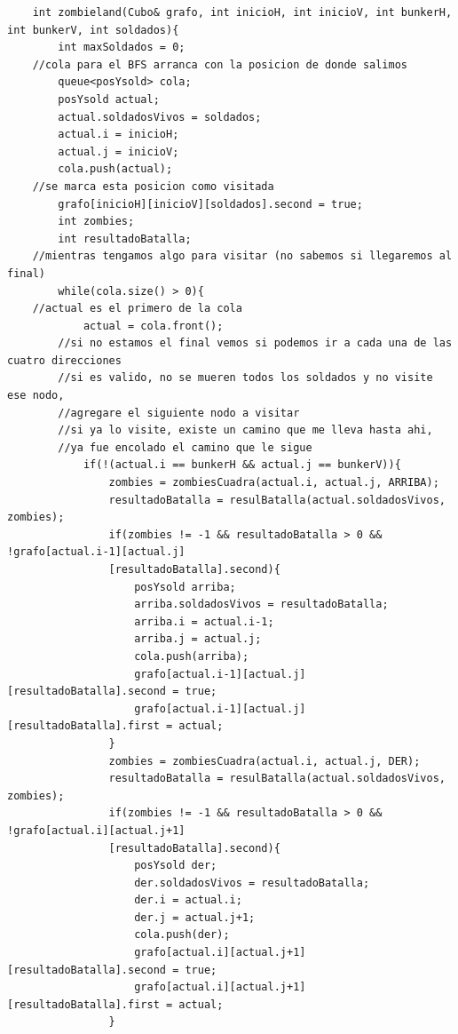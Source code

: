 	\begin{codesnippet}
	\begin{verbatim}
    int zombieland(Cubo& grafo, int inicioH, int inicioV, int bunkerH, int bunkerV, int soldados){
        int maxSoldados = 0;
    //cola para el BFS arranca con la posicion de donde salimos
        queue<posYsold> cola;
        posYsold actual;
        actual.soldadosVivos = soldados;
        actual.i = inicioH;
        actual.j = inicioV;
        cola.push(actual);
    //se marca esta posicion como visitada
        grafo[inicioH][inicioV][soldados].second = true;
        int zombies;
        int resultadoBatalla;
    //mientras tengamos algo para visitar (no sabemos si llegaremos al final)
        while(cola.size() > 0){
    //actual es el primero de la cola
            actual = cola.front();
        //si no estamos el final vemos si podemos ir a cada una de las cuatro direcciones
        //si es valido, no se mueren todos los soldados y no visite ese nodo, 
        //agregare el siguiente nodo a visitar
        //si ya lo visite, existe un camino que me lleva hasta ahi, 
        //ya fue encolado el camino que le sigue
            if(!(actual.i == bunkerH && actual.j == bunkerV)){
                zombies = zombiesCuadra(actual.i, actual.j, ARRIBA);
                resultadoBatalla = resulBatalla(actual.soldadosVivos, zombies);
                if(zombies != -1 && resultadoBatalla > 0 && !grafo[actual.i-1][actual.j]
                [resultadoBatalla].second){
                    posYsold arriba;
                    arriba.soldadosVivos = resultadoBatalla;
                    arriba.i = actual.i-1;
                    arriba.j = actual.j;
                    cola.push(arriba);
                    grafo[actual.i-1][actual.j][resultadoBatalla].second = true;
                    grafo[actual.i-1][actual.j][resultadoBatalla].first = actual;
                }
                zombies = zombiesCuadra(actual.i, actual.j, DER);
                resultadoBatalla = resulBatalla(actual.soldadosVivos, zombies);
                if(zombies != -1 && resultadoBatalla > 0 && !grafo[actual.i][actual.j+1]
                [resultadoBatalla].second){
                    posYsold der;
                    der.soldadosVivos = resultadoBatalla;
                    der.i = actual.i;
                    der.j = actual.j+1;
                    cola.push(der);
                    grafo[actual.i][actual.j+1][resultadoBatalla].second = true;
                    grafo[actual.i][actual.j+1][resultadoBatalla].first = actual;
                }
	\end{verbatim}
	\end{codesnippet}

